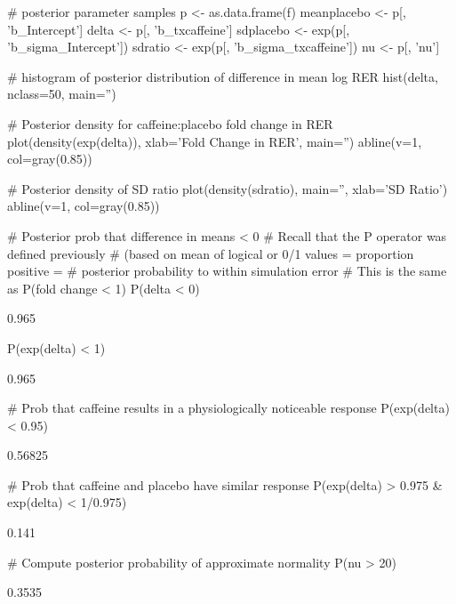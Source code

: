 \begin{Schunk}
\begin{Sinput}
# posterior parameter samples
p <- as.data.frame(f)
meanplacebo <- p[, 'b_Intercept']
delta       <- p[, 'b_txcaffeine']
sdplacebo   <- exp(p[, 'b_sigma_Intercept'])
sdratio     <- exp(p[, 'b_sigma_txcaffeine'])
nu          <- p[, 'nu']

# histogram of posterior distribution of difference in mean log RER
hist(delta, nclass=50, main='')

# Posterior density for caffeine:placebo fold change in RER
plot(density(exp(delta)), xlab='Fold Change in RER', main='')
abline(v=1, col=gray(0.85))

# Posterior density of SD ratio
plot(density(sdratio), main='', xlab='SD Ratio')
abline(v=1, col=gray(0.85))

# Posterior prob that difference in means < 0
# Recall that the P operator was defined previously
# (based on mean of logical or 0/1 values = proportion positive =
#  posterior probability to within simulation error
# This is the same as P(fold change < 1)
P(delta < 0)
\end{Sinput}
\begin{Soutput}
[1] 0.965
\end{Soutput}
\begin{Sinput}
P(exp(delta) < 1)
\end{Sinput}
\begin{Soutput}
[1] 0.965
\end{Soutput}
\begin{Sinput}
# Prob that caffeine results in a physiologically noticeable response
P(exp(delta) < 0.95)
\end{Sinput}
\begin{Soutput}
[1] 0.56825
\end{Soutput}
\begin{Sinput}
# Prob that caffeine and placebo have similar response
P(exp(delta) > 0.975 & exp(delta) < 1/0.975)
\end{Sinput}
\begin{Soutput}
[1] 0.141
\end{Soutput}
\begin{Sinput}
# Compute posterior probability of approximate normality
P(nu > 20)
\end{Sinput}
\begin{Soutput}
[1] 0.3535
\end{Soutput}



\end{Schunk}
